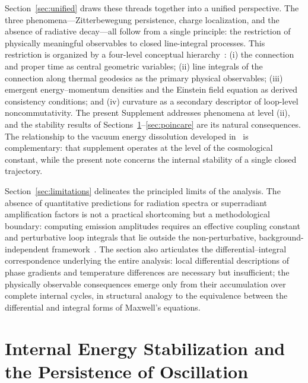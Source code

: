 \documentclass[12pt,a4paper]{article}
\begin{document}
Section~\ref{sec:unified} draws these threads together into a unified perspective. The three phenomena---Zitterbewegung persistence, charge localization, and the absence of radiative decay---all follow from a single principle: the restriction of physically meaningful observables to closed line-integral processes. This restriction is organized by a four-level conceptual hierarchy~\cite{hanamura18203433}: (i) the connection and proper time as central geometric variables; (ii) line integrals of the connection along thermal geodesics as the primary physical observables; (iii) emergent energy--momentum densities and the Einstein field equation as derived consistency conditions; and (iv) curvature as a secondary descriptor of loop-level noncommutativity. The present Supplement addresses phenomena at level (ii), and the stability results of Sections~\ref{sec:stabilization}--\ref{sec:poincare} are its natural consequences. The relationship to the vacuum energy dissolution developed in~\cite{hanamura18727981} is complementary: that supplement operates at the level of the cosmological constant, while the present note concerns the internal stability of a single closed trajectory.

Section~\ref{sec:limitations} delineates the principled limits of the analysis. The absence of quantitative predictions for radiation spectra or superradiant amplification factors is not a practical shortcoming but a methodological boundary: computing emission amplitudes requires an effective coupling constant and perturbative loop integrals that lie outside the non-perturbative, background-independent framework~\cite{hanamura18603340}. The section also articulates the differential--integral correspondence underlying the entire analysis: local differential descriptions of phase gradients and temperature differences are necessary but insufficient; the physically observable consequences emerge only from their accumulation over complete internal cycles, in structural analogy to the equivalence between the differential and integral forms of Maxwell's equations.

\section{Internal Energy Stabilization and the Persistence of Oscillation}
\label{sec:stabilization}
\end{document}
